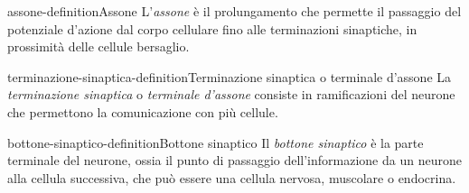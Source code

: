 \documentclass[preview]{standalone}
\begin{document}
\begin{snippetdefinition}{assone-definition}{Assone}
    L'\textit{assone} è il prolungamento che permette il passaggio del
    potenziale d'azione dal corpo cellulare fino
    alle terminazioni sinaptiche, in prossimità delle cellule bersaglio.
\end{snippetdefinition}

\begin{snippetdefinition}{terminazione-sinaptica-definition}{Terminazione sinaptica o terminale d'assone}
    La \textit{terminazione sinaptica} o \textit{terminale d'assone}
    consiste in ramificazioni del neurone che permettono
    la comunicazione con più cellule.
\end{snippetdefinition}

\begin{snippetdefinition}{bottone-sinaptico-definition}{Bottone sinaptico}
    Il \textit{bottone sinaptico} è la parte terminale del neurone,
    ossia il punto di passaggio dell'informazione da un neurone
    alla cellula successiva, che può essere una cellula nervosa,
    muscolare o endocrina.
\end{snippetdefinition}
\end{document}
